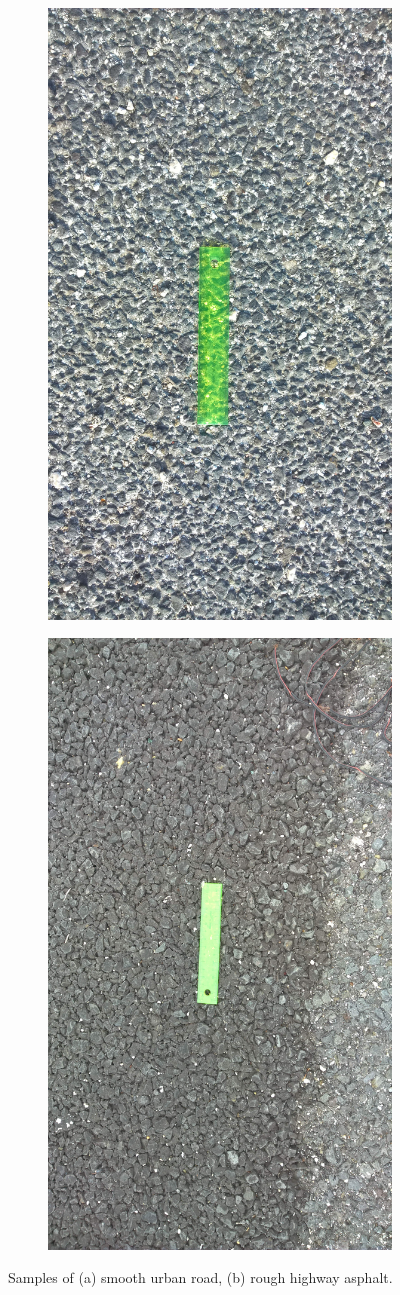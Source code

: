 \begin{figure}[h]
	\centering
	\begin{subfigure}[b]{0.48\textwidth}
		\centering
		\includegraphics[width=0.45\columnwidth, angle = 270]{img/Smooth.jpg}
	\end{subfigure}
	\hfill 
	\begin{subfigure}[b]{0.48\textwidth}
		\centering   
		\includegraphics[width=0.45\columnwidth, angle = 270]{img/Rough.jpg} 
	\end{subfigure} 
	\caption[Road samples]{Samples of (a) smooth urban road, (b) rough highway asphalt.}
	\label{fig:road}
\end{figure}


